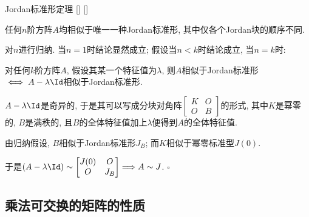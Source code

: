 \documentclass[UTF8]{ctexart}
\begin{document}
		\begin{thm}
			[]
			{Jordan标准形定理}
			[]
			[]

			任何$n$阶方阵$A$均相似于唯一一种Jordan标准形, 其中仅各个Jordan块的顺序不同. 
		\end{thm}
		
		\begin{prf}

			对$n$进行归纳. 当$n=1$时结论显然成立; 假设当$n<k$时结论成立, 当$n=k$时: 

			对任何$k$阶方阵$A$, 假设其某一个特征值为$\lambda$, 则$A$相似于Jordan标准形$\iff A-\lambda\Id$相似于Jordan标准形. 
			
			$A-\lambda\Id$是奇异的, 于是其可以写成分块对角阵$
			\begin{bmatrix}
				K & O\\
				O & B
			\end{bmatrix}$的形式, 其中$K$是幂零的, $B$是满秩的, 且$B$的全体特征值加上$\lambda$便得到$A$的全体特征值. 
			
			由归纳假设, $B$相似于Jordan标准形$J_B$; 而$K$相似于幂零标准型$J(0)$. 

			于是$(A-\lambda\Id)\sim
			\begin{bmatrix}
				J(0) & O\\
				O & J_B
			\end{bmatrix}
			\Longrightarrow
			A\sim J$. $\square$
		\end{prf}
	\subsection{乘法可交换的矩阵的性质}
\end{document}
